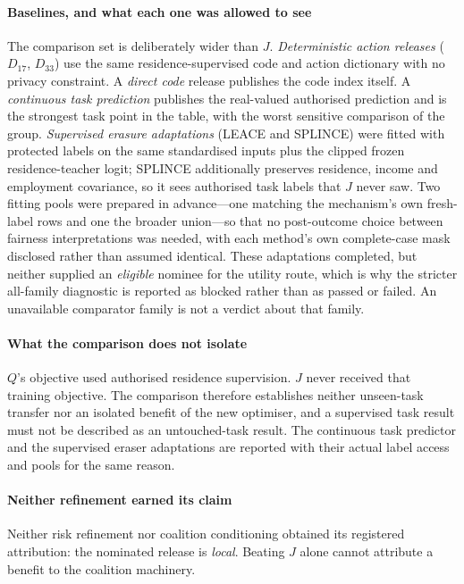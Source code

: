 \documentclass[conference]{IEEEtran}
\begin{document}
\paragraph{Baselines, and what each one was allowed to see} The comparison set is deliberately wider than
$J$. \emph{Deterministic action releases} ($D_{17}$, $D_{33}$) use the same residence-supervised code and action
dictionary with no privacy constraint. A \emph{direct code} release publishes the code index itself. A
\emph{continuous task prediction} publishes the real-valued authorised prediction and is the strongest task
point in the table, with the worst sensitive comparison of the group. \emph{Supervised erasure adaptations}
(LEACE and SPLINCE) were fitted with protected labels on the same standardised inputs plus the clipped
frozen residence-teacher logit; SPLINCE additionally preserves residence, income and employment covariance,
so it sees authorised task labels that $J$ never saw. Two fitting pools were prepared in advance---one
matching the mechanism's own fresh-label rows and one the broader union---so that no post-outcome choice
between fairness interpretations was needed, with each method's own complete-case mask disclosed rather
than assumed identical. These adaptations completed, but neither supplied an \emph{eligible} nominee for
the utility route, which is why the stricter all-family diagnostic is reported as blocked rather than as
passed or failed. An unavailable comparator family is not a verdict about that family.

\paragraph{What the comparison does not isolate} $Q$'s objective used authorised residence supervision.
$J$ never received that training objective. The comparison therefore establishes neither unseen-task
transfer nor an isolated benefit of the new optimiser, and a supervised task result must not be described
as an untouched-task result. The continuous task predictor and the supervised eraser adaptations are
reported with their actual label access and pools for the same reason.

\paragraph{Neither refinement earned its claim} Neither risk refinement nor coalition conditioning obtained
its registered attribution: the nominated release is \emph{local}. Beating $J$ alone cannot attribute a
benefit to the coalition machinery.
\end{document}
